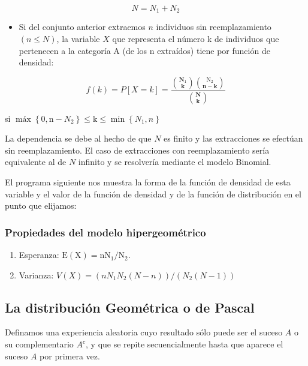\documentclass[
  a4paper,
  DIV=11,
  numbers=noendperiod]{scrreprt}
\providecommand{\tightlist}{%
  \setlength{\itemsep}{0pt}\setlength{\parskip}{0pt}}\usepackage{longtable,booktabs,array}
\begin{document}
\[
N=N_{1}+N_{2}
\]

\begin{itemize}
\tightlist
\item
  Si del conjunto anterior extraemos \(n\) individuos sin
  reemplazamiento \((n \leq N)\), la variable \(X\) que representa el
  número k de individuos que pertenecen a la categoría A (de los n
  extraídos) tiene por función de densidad:
\end{itemize}

\[
f(k)=P[X=k]=\frac{\binom{\mathbf{N}_{1}}{\mathbf{k}}\binom{\mathrm{N}_{2}}{\mathbf{n}-\mathbf{k}}}{\binom{\mathbf{N}}{\mathbf{k}}}
\]

si
\(\operatorname{máx}\left\{0, \mathrm{n}-N_{2}\right\} \leq \mathrm{k} \leq \min \left\{N_{1}, n\right\}\)

La dependencia se debe al hecho de que \(N\) es finito y las
extracciones se efectúan sin reemplazamiento. El caso de extracciones
con reemplazamiento sería equivalente al de \(N\) infinito y se
resolvería mediante el modelo Binomial.

El programa siguiente nos muestra la forma de la función de densidad de
esta variable y el valor de la función de densidad y de la función de
distribución en el punto que elijamos:

\subsubsection{Propiedades del modelo
hipergeométrico}\label{propiedades-del-modelo-hipergeomuxe9trico}

\begin{enumerate}
\def\labelenumi{\arabic{enumi}.}
\item
  Esperanza:
  \(\mathrm{E}(\mathrm{X})=\mathrm{n} \mathrm{N}_{1} / \mathrm{N}_{2}\).
\item
  Varianza:
  \(V(X)=\left(n N_{1} N_{2}(N-n)\right) /\left(N_{2}(N-1)\right)\)
\end{enumerate}

\subsection{La distribución Geométrica o de
Pascal}\label{la-distribuciuxf3n-geomuxe9trica-o-de-pascal}

Definamos una experiencia aleatoria cuyo resultado sólo puede ser el
suceso \(A\) o su complementario \(A^{c}\), y que se repite
secuencialmente hasta que aparece el suceso \(A\) por primera vez.
\end{document}
